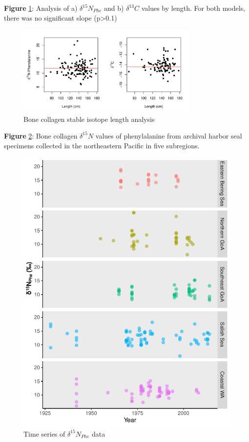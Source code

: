 \documentclass [11pt, proquest] {uwthesis}[2015/03/03]
\begin{document}
\textbf{Figure} \ref{fig:Length}: Analysis of a) \(\delta^{15}N_{Phe}\)
and b) \(\delta^{13}C\) values by length. For both models, there was no
significant slope (p\textgreater{}0.1) \newline 
\begin{figure}[h]
\centering
  \includegraphics[width=0.8\textwidth]{figure/Ch2/FigureS2.pdf}
  \caption{Bone collagen stable isotope length analysis}
  \label{fig:Length}
\end{figure}
\clearpage

\textbf{Figure} \ref{fig:TSphe}: Bone collagen \(\delta^{15}N\) values
of phenylalanine from archival harbor seal specimens collected in the
northeastern Pacific in five subregions. \newline 
\begin{figure}[h]
\centering
  \includegraphics[height=0.8\textwidth]{figure/Ch2/FigureS3.pdf}
  \caption{Time series of $\delta^{15}N_{Phe}$ data}
  \label{fig:TSphe}
\end{figure}
\clearpage
\end{document}
